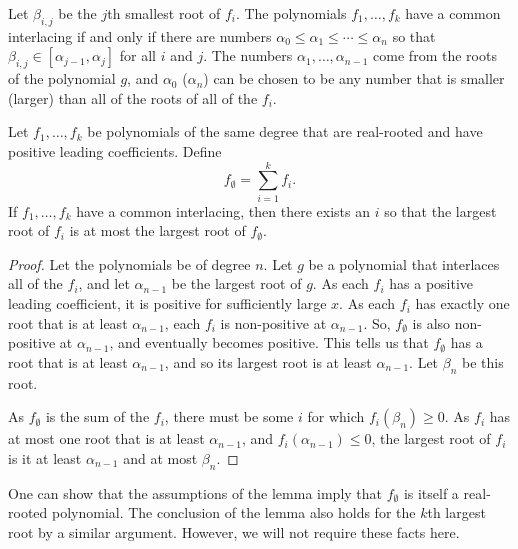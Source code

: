 \documentclass[11pt]{article}
\newcommand{\nikhil}[1]{{\bf \color{green} Nikhil: #1}}
\begin{document}
Let $\beta_{i,j}$ be the $j$th smallest root of $f_{i}$.
The polynomials $f_{1}, \dotsc , f_{k}$ have a common interlacing if 
  and only if there are
  numbers $\alpha_{0} \leq \alpha_{1} \leq  \dotsb \leq \alpha_{n}$ so that
  $\beta_{i,j} \in [\alpha_{j-1}, \alpha_{j}]$ for all $i$ and $j$.
The numbers $\alpha_{1}, \dotsc , \alpha_{n-1}$ come from the roots of the polynomial $g$,
  and $\alpha_{0}$ ($\alpha_{n}$) can be chosen to be any number that is smaller (larger) than
  all of the roots of all of the $f_{i}$. 


\begin{lemma}\label{lem:interlacing}
Let $f_{1}, \dotsc , f_{k}$ be polynomials of the same degree that are real-rooted and have positive leading coefficients.
Define
\[
  f_{\emptyset} = \sum_{i=1}^{k} f_{i}.
\]
If $f_{1}, \dotsc , f_{k}$ have a common interlacing,
  then
  there exists an $i$ so that the largest root of $f_{i}$ is at most the largest root of
  $f_{\emptyset}$.
\end{lemma}
\begin{proof}
Let the polynomials be of degree $n$.
Let $g$ be a polynomial that interlaces all of the $f_{i}$, 
  and  let $\alpha_{n-1}$ be the largest root of $g$.
As each $f_{i}$ has a positive leading coefficient, it is positive for sufficiently large $x$.
As each $f_{i}$ has exactly one root that is at least $\alpha_{n-1}$, each
  $f_{i}$ is non-positive at $\alpha_{n-1}$.
So, $f_{\emptyset}$ is also non-positive at $\alpha_{n-1}$, and eventually
  becomes positive.
This tells us that $f_{\emptyset}$ has a root that is at least $\alpha_{n-1}$,
  and so its largest root is at least $\alpha_{n-1}$.
Let $\beta_{n}$ be this root.

As $f_{\emptyset}$ is the sum of the $f_{i}$, there must be some $i$
  for which $f_{i} (\beta_{n}) \geq 0$.
As $f_{i}$ has at most one root that is at least $\alpha_{n-1}$,
  and $f_{i} (\alpha_{n-1}) \leq 0$, the largest root of $f_{i}$  
  is it at least $\alpha_{n-1}$ and at most $\beta_{n}$.
\end{proof}

One can show that the assumptions of the lemma imply that $f_{\emptyset}$
  is itself a real-rooted polynomial. 
The conclusion of the lemma also holds for the $k$th largest root 
  by a similar argument.
However, we will not require these facts here.
\end{document}
